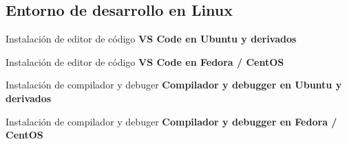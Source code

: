 \subsection{Entorno de desarrollo en Linux}
\begin{frame}[fragile]{Instalación de editor de código}
  \textbf{VS Code en Ubuntu y derivados}
\end{frame}


\begin{frame}[fragile]{Instalación de editor de código}
  \textbf{VS Code en Fedora / CentOS}
\end{frame}


\begin{frame}[fragile]{Instalación de compilador y debuger}
  \textbf{Compilador y debugger en Ubuntu y derivados}
\end{frame}


\begin{frame}[fragile]{Instalación de compilador y debuger}
  \textbf{Compilador y debugger en Fedora / CentOS}
\end{frame}
